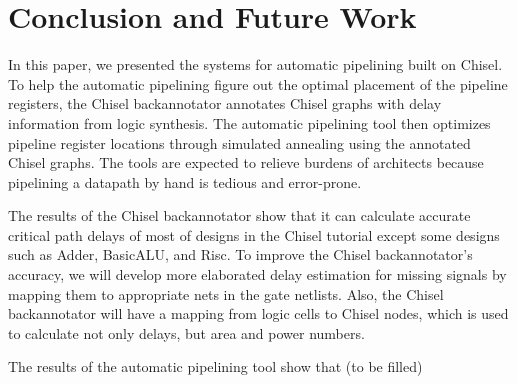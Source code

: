 \section{Conclusion and Future Work}
In this paper, we presented the systems for automatic pipelining built on Chisel. To help the automatic pipelining figure out the optimal placement of the pipeline registers, the Chisel backannotator annotates Chisel graphs with delay information from logic synthesis. The automatic pipelining tool then optimizes pipeline register locations through simulated annealing using the annotated Chisel graphs. The tools are expected to relieve burdens of architects because pipelining a datapath by hand is tedious and error-prone.

The results of the Chisel backannotator show that it can calculate accurate critical path delays of most of designs in the Chisel tutorial except some designs such as Adder, BasicALU, and Risc. To improve the Chisel backannotator's accuracy, we will develop more elaborated delay estimation for missing signals by mapping them to appropriate nets in the gate netlists. Also, the Chisel backannotator will have a mapping from logic cells to Chisel nodes, which is used to calculate not only delays, but area and power numbers.

The results of the automatic pipelining tool show that (to be filled)